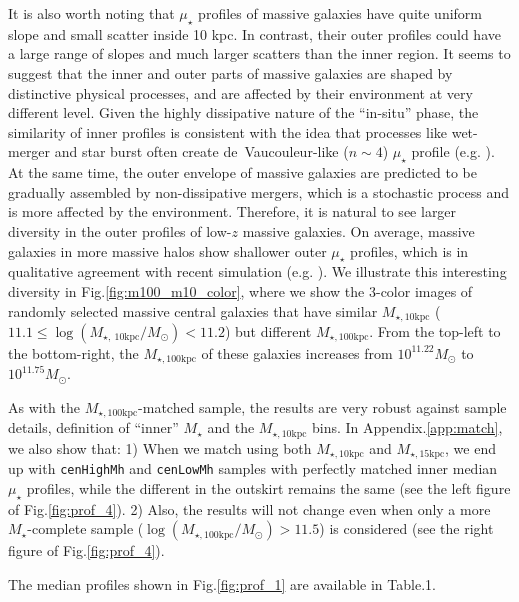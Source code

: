 \documentclass{emulateapj}
\def\rbcg{\texttt{cenHighMh}}
\def\nbcg{\texttt{cenLowMh}}
\def\mstar{{$M_{\star}$}}
\def\minn{{$M_{\star,10\mathrm{kpc}}$}}
\def\meff{{$M_{\star,15\mathrm{kpc}}$}}
\def\mtot{{$M_{\star,100\mathrm{kpc}}$}}
\def\logmtot{{$\log (M_{\star,100\mathrm{kpc}}/M_{\odot})$}}
\def\mden{{$\mu_{\star}$}}
\begin{document}
\begin{CJK*}{UTF8}{gbsn}
    It is also worth noting that \mden{} profiles of massive galaxies have quite uniform
    slope and small scatter inside 10 kpc.  
    In contrast, their outer profiles could have a large range of slopes and much 
    larger scatters than the inner region. 
    It seems to suggest that the inner and outer parts of massive galaxies are shaped 
    by distinctive physical processes, and are affected by their environment at 
    very different level. 
    Given the highly dissipative nature of the ``in-situ'' phase, the similarity of 
    inner profiles is consistent with the idea that processes like wet-merger and 
    star burst often create de~Vaucouleur-like ($n\sim 4$) \mden{} profile
    (e.g. \citealt{Hopkins2008}).
    At the same time, the outer envelope of massive galaxies are predicted to be 
    gradually assembled by non-dissipative mergers, which is a stochastic process and 
    is more affected by the environment.  
    Therefore, it is natural to see larger diversity in the outer profiles of 
    low-$z$ massive galaxies. 
    On average, massive galaxies in more massive halos show shallower outer \mden{} 
    profiles, which is in qualitative agreement with recent simulation
    (e.g. \citealt{Pillepich2014}).
    We illustrate this interesting diversity in Fig.\ref{fig:m100_m10_color}, where 
    we show the 3-color images of randomly selected massive central galaxies that 
    have similar \minn{} ($11.1 \leq \log (M_{\star,\ 10\mathrm{kpc}}/M_{\odot}) < 11.2$)
    but different \mtot{}.   
    From the top-left to the bottom-right, the \mtot{} of these galaxies increases
    from $10^{11.22} M_{\odot}$ to $10^{11.75} M_{\odot}$.
    
    As with the \mtot{}-matched sample, the results are very robust against 
    sample details, definition of ``inner'' \mstar{} and the \minn{} bins. 
    In Appendix.\ref{app:match}, we also show that:
    1) When we match using both \minn{} and \meff{}, we end up with \rbcg{} and \nbcg{} 
    samples with perfectly matched inner median \mden{} profiles, while the different 
    in the outskirt remains the same (see the left figure of Fig.\ref{fig:prof_4}).  
    2) Also, the results will not change even when only a more \mstar{}-complete sample
    (\logmtot{}$> 11.5$) is considered (see the right figure of Fig.\ref{fig:prof_4}). 
      
    The median profiles shown in Fig.\ref{fig:prof_1} are available in Table.1.


\end{CJK*}
\end{document}

